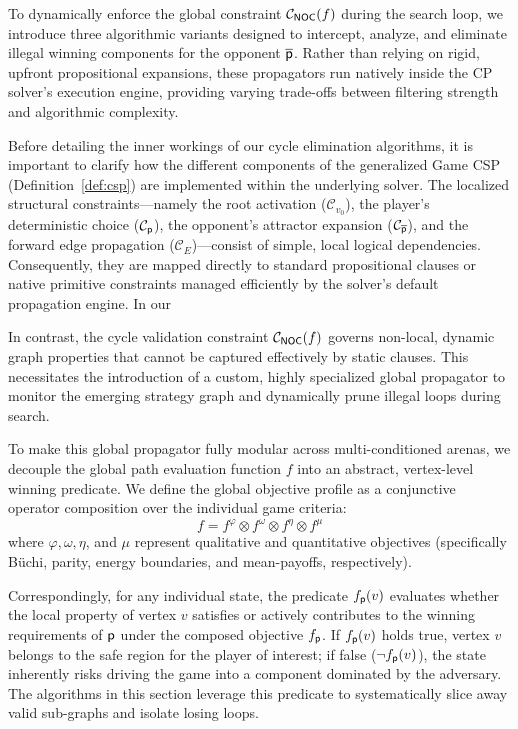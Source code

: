 \documentclass[a4paper,fleqn]{cas-sc}
\begin{document}
To dynamically enforce the global constraint $\mathcal{C}_{{\textsf{NOC}}}(f)$ during the search loop, we introduce three algorithmic variants designed to intercept, analyze, and eliminate illegal winning components for the opponent $\overline{\mathsf{p}}$. Rather than relying on rigid, upfront propositional expansions, these propagators run natively inside the CP solver's execution engine, providing varying trade-offs between filtering strength and algorithmic complexity.


Before detailing the inner workings of our cycle elimination algorithms, it is important to clarify how the different components of the generalized Game CSP (Definition~\ref{def:csp}) are implemented within the underlying solver. The localized structural constraints—namely the root activation ($\mathcal{C}_{v_0}$), the player's deterministic choice ($\mathcal{C}_{\mathsf{p}}$), the opponent's attractor expansion ($\mathcal{C}_{\overline{\mathsf{p}}}$), and the forward edge propagation ($\mathcal{C}_E$)—consist of simple, local logical dependencies. Consequently, they are mapped directly to standard propositional clauses or native primitive constraints managed efficiently by the solver's default propagation engine. In our 

In contrast, the cycle validation constraint $\mathcal{C}_{{\textsf{NOC}}}(f)$ governs non-local, dynamic graph properties that cannot be captured effectively by static clauses. This necessitates the introduction of a custom, highly specialized global propagator to monitor the emerging strategy graph and dynamically prune illegal loops during search.

To make this global propagator fully modular across multi-conditioned arenas, we decouple the global path evaluation function $f$ into an abstract, vertex-level winning predicate. We define the global objective profile as a conjunctive operator composition over the individual game criteria:
\[
f = f^\mathcal{\varphi} \otimes f^\omega \otimes f^\eta \otimes f^\mu 
\]
where $\varphi, \omega, \eta$, and $\mu$ represent qualitative and quantitative objectives (specifically Büchi, parity, energy boundaries, and mean-payoffs, respectively). 

Correspondingly, for any individual state, the predicate $f_{\mathsf{p}}(v)$ evaluates whether the local property of vertex $v$ satisfies or actively contributes to the winning requirements of $\mathsf{p}$ under the composed objective $f_{\mathsf{p}}$. If $f_{\mathsf{p}}(v)$ holds true, vertex $v$ belongs to the safe region for the player of interest; if false ($\neg f_{\mathsf{p}}(v)$), the state inherently risks driving the game into a component dominated by the adversary. The algorithms in this section leverage this predicate to systematically slice away valid sub-graphs and isolate losing loops.
\end{document}
